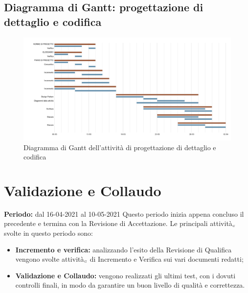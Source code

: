 \subsection{Diagramma di Gantt: progettazione di dettaglio e codifica}\label{PianificazioneDiagrammaDiGanttProgettazioneDettaglio}
\begin{figure}[!h]
	\begin{center}
		\includegraphics[width=0.8\linewidth]{../immagini/pdp/gantt_progettazione_dettaglio.png}
		\caption{Diagramma di Gantt dell'attività di progettazione di dettaglio e codifica}
	\end{center}
\end{figure}
\section{Validazione e Collaudo}\label{PianificazioneValidazione}
\textbf{Periodo:} dal 16-04-2021 al 10-05-2021
Questo periodo inizia appena concluso il precedente e termina con la Revisione di Accettazione.
Le principali attività$_{\scaleto{G}{3pt}}$ svolte in questo periodo sono:
\begin{itemize}
	\item \textbf{Incremento e verifica:} analizzando l'esito della Revisione di Qualifica vengono svolte attività$_{\scaleto{G}{3pt}}$ di Incremento e Verifica sui vari documenti redatti;
	\item \textbf{Validazione e Collaudo:} vengono realizzati gli ultimi test, con i dovuti controlli finali, in modo da garantire un buon livello di qualità e correttezza.
\end{itemize}
